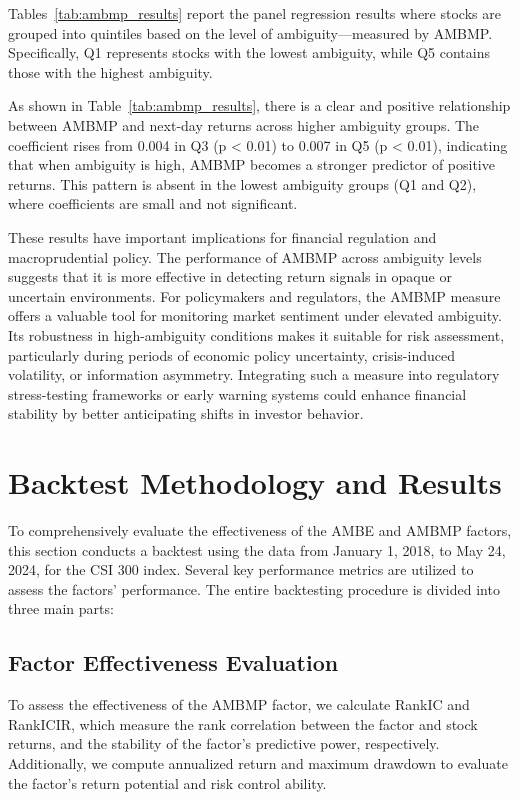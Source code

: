\documentclass[preprint,12pt,authoryear]{elsarticle}
\begin{document}
Tables~\ref{tab:ambmp_results} report the panel regression results where stocks are grouped into quintiles based on the level of ambiguity—measured by AMBMP. Specifically, Q1 represents stocks with the lowest ambiguity, while Q5 contains those with the highest ambiguity.

As shown in Table~\ref{tab:ambmp_results}, there is a clear and positive relationship between AMBMP and next-day returns across higher ambiguity groups. The coefficient rises from 0.004 in Q3 (p < 0.01) to 0.007 in Q5 (p < 0.01), indicating that when ambiguity is high, AMBMP becomes a stronger predictor of positive returns. This pattern is absent in the lowest ambiguity groups (Q1 and Q2), where coefficients are small and not significant.

These results have important implications for financial regulation and macroprudential policy. The performance of AMBMP across ambiguity levels suggests that it is more effective in detecting return signals in opaque or uncertain environments. For policymakers and regulators, the AMBMP measure offers a valuable tool for monitoring market sentiment under elevated ambiguity. Its robustness in high-ambiguity conditions makes it suitable for risk assessment, particularly during periods of economic policy uncertainty, crisis-induced volatility, or information asymmetry. Integrating such a measure into regulatory stress-testing frameworks or early warning systems could enhance financial stability by better anticipating shifts in investor behavior.

\section{Backtest Methodology and Results}
To comprehensively evaluate the effectiveness of the AMBE and AMBMP factors, this section conducts a backtest using the data from January 1, 2018, to May 24, 2024, for the CSI 300 index. Several key performance metrics are utilized to assess the factors' performance. The entire backtesting procedure is divided into three main parts:

\subsection{Factor Effectiveness Evaluation}
To assess the effectiveness of the AMBMP factor, we calculate RankIC and RankICIR, which measure the rank correlation between the factor and stock returns, and the stability of the factor's predictive power, respectively. Additionally, we compute annualized return and maximum drawdown to evaluate the factor's return potential and risk control ability.
\end{document}
